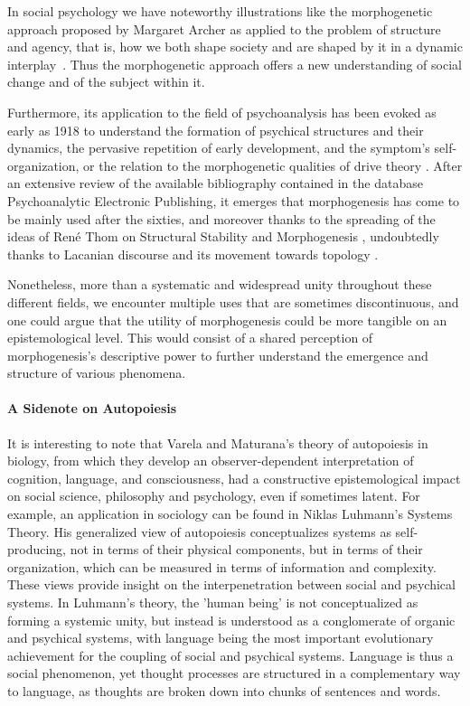 In social psychology we have noteworthy illustrations like the morphogenetic approach proposed by Margaret Archer as applied to the problem of structure and agency, that is, how we both shape society and are shaped by it in a dynamic interplay~\cite{archer_margaret_1999}. Thus the morphogenetic approach offers a new understanding of social change and of the subject within it.  

Furthermore, its application to the field of psychoanalysis has been evoked as early as 1918 to understand the formation of psychical structures and their dynamics, the pervasive repetition of early development, and the symptom’s self-organization, or the relation to the morphogenetic qualities of drive theory \cite{benedek_instinct_1973}. After an extensive review of the available bibliography contained in the database Psychoanalytic Electronic Publishing, it emerges that morphogenesis has come to be mainly used after the sixties, and moreover thanks to the spreading of the ideas of René Thom on Structural Stability and Morphogenesis \cite{de_luca_picione_processes_2016}, undoubtedly thanks to Lacanian discourse and its movement towards topology \cite{nasio_five_1998}. 

Nonetheless, more than a systematic and widespread unity throughout these different fields, we encounter multiple uses that are sometimes discontinuous, and one could argue that the utility of morphogenesis could be more tangible on an epistemological level. This would consist of a shared perception of morphogenesis’s descriptive power to further understand the emergence and structure of various phenomena.

\paragraph*{A Sidenote on Autopoiesis}{}

It is interesting to note that Varela and Maturana’s theory of autopoiesis in biology, from which they develop an observer-dependent interpretation of cognition, language, and consciousness, had a constructive epistemological impact on social science, philosophy and psychology, even if sometimes latent. For example, an application in sociology can be found in Niklas Luhmann's Systems Theory. His generalized view of autopoiesis conceptualizes systems as self-producing, not in terms of their physical components, but in terms of their organization, which can be measured in terms of information and complexity\cite{gershenson_requisite_2014}. These views provide insight on the interpenetration between social and psychical systems. In Luhmann's theory, the 'human being' is not conceptualized as forming a systemic unity, but instead is understood as a conglomerate of organic and psychical systems, with language being the most important evolutionary achievement for the coupling of social and psychical systems. Language is thus a social phenomenon, yet thought processes are structured in a complementary way to language, as thoughts are broken down into chunks of sentences and words. \cite{seidl_luhmanns_2004}

